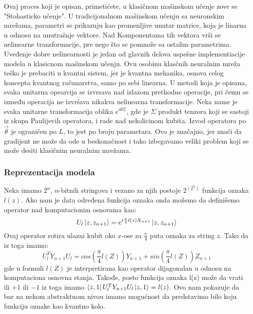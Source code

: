 \documentclass[12pt, letterpaper, oneside]{article}
\begin{document}
Ovaj proces koji je opisan, primetićete, u klasičnom mašinskom učenje zove se "Stohasticko učenje".
U tradicijonalnom mašinskom učenju sa neuronskim mrežama, parametri se prikazuju kao promenljive unutar matrice, koja je linarna u odnosu na unutrašnje vektore.
Nad Komponentama tih vektora vrši se nelinearne transformacije, pre nego što se pomnože sa ostalim parametrima. 
Uveđenje dobre nelinearnosti je jedan od glavnih delova uspešne implementiacije modela u klasicnom mašinskom učenju.
Ovu osobinu klasčnih neuralnim mreža teško je prebaciti u kvantni sistem, jer je kvantna mehanika, osnova celog koncepta kvantnog računarstva, samo po sebi linearna.
U metodi koja je opisana, svaka unitarna opearcija se izvrsava nad izlazom prethodne operacije, pri čemu se između operacija ne izvršava nikakva nelinearna transformacije.
Neka name je svaka unitarne transformacija oblika $e^{i\theta\Sigma}$, gde je $\Sigma$ produkt tenzora koji se sastoji iz skupa Paulijevih operatora, i rade nad nekolicinom kubita.
Izvod operatora po $\overrightarrow{\theta}$ je ograničen po $L$, to jest po broju parametara. Ovo je značajno, jer znači da gradijent ne može da ode u beskonačnost i tako izbegavamo 
veliki problem koji se može desiti klasičnim neuralnim mrežama.

\subsubsection{Reprezentacija modela}
Neka imamo $2^n$, $n$-bitnih stringova i vezano za njih postoje $2^{(2^n)}$ funkcija oznaka $l(z)$.
Ako nam je data određena funkcija oznaka onda možemo da definišemo operator nad komputacionim osnovama kao:
\[
    U_l\Ket{z,z_{n+1}} = e^{i\frac{\pi}{4}l(z)X_{n+1}}\Ket{z,z_{n+1}}
\]
Ovaj operator rotira ulazni kubit oko $x$-ose za $\frac{\pi}{4}$ puta oznaka za string $z$.
Tako da iz toga imamo:
\[
    U_l^TY_{n+1}U_l = cos(\frac{\pi}{4}l(Z))Y_{n+1} + sin(\frac{\pi}{4}l(Z))Z_{n+1}
\]
gde u formuli $l(Z)$ je interpretirana kao operator dijagonalan u odnosu na komputaciona osnovna stanja.
Takođe, posto funkcija oznaka l(z) može da vrati ili $+1$ ili $-1$ iz toga imamo $\bra{z,1}U_l^TY_{n+1}U_l\ket{z,1} = l(z)$.
Ovo nam pokazuje da bar na nekom abstraktnom nivou imamo mogućnost da predstavimo bilo koju funkciju oznake kao kvantno kolo.
\end{document}
